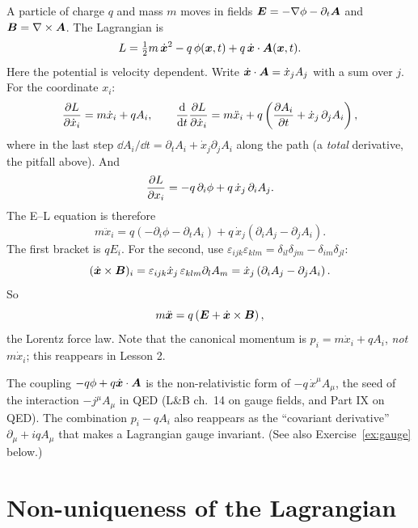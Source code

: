 \documentclass[11pt]{article}
\begin{document}
\begin{example}
A particle of charge $q$ and mass $m$ moves in fields $\bm{E}=-\nabla\phi-\partial_t\bm{A}$ and $\bm{B}=\nabla\times\bm{A}$. The Lagrangian is
\begin{equation}
  L=\tfrac12m\,\dot{\bm{x}}^2-q\,\phi(\bm{x},t)+q\,\dot{\bm{x}}\cdot\bm{A}(\bm{x},t).
\end{equation}
Here the potential is velocity dependent. Write $\dot{\bm{x}}\cdot\bm{A}=\dot x_jA_j$ with a sum over $j$. For the coordinate $x_i$:
\[
 \frac{\partial L}{\partial \dot x_i}=m\dot x_i+qA_i,\qquad
 \frac{\mathrm{d} }{\mathrm{d} t}\frac{\partial L}{\partial \dot x_i}=m\ddot x_i+q\left(\frac{\partial A_i}{\partial t}+\dot x_j\,\partial_jA_i\right),
\]
where in the last step $\dd A_i/\dd t=\partial_tA_i+\dot x_j\partial_jA_i$ along the path (a \emph{total} derivative, the pitfall above). And
\[
 \frac{\partial L}{\partial x_i}=-q\,\partial_i\phi+q\,\dot x_j\,\partial_iA_j .
\]
The E--L equation is therefore
\begin{equation}
  m\ddot x_i=q\left(-\partial_i\phi-\partial_tA_i\right)+q\,\dot x_j\left(\partial_iA_j-\partial_jA_i\right).
\end{equation}
The first bracket is $qE_i$. For the second, use $\varepsilon_{ijk}\varepsilon_{klm}=\delta_{il}\delta_{jm}-\delta_{im}\delta_{jl}$:
\[
 (\dot{\bm{x}}\times\bm{B})_i=\varepsilon_{ijk}\dot x_j\,\varepsilon_{klm}\partial_lA_m=\dot x_j\left(\partial_iA_j-\partial_jA_i\right).
\]
So
\begin{equation}
  m\ddot{\bm{x}}=q\left(\bm{E}+\dot{\bm{x}}\times\bm{B}\right),
\end{equation}
the Lorentz force law. Note that the canonical momentum is $p_i=m\dot x_i+qA_i$, \emph{not} $m\dot x_i$; this reappears in Lesson 2.
\end{example}

\begin{qftbridge}
The coupling $-q\phi+q\dot{\bm{x}}\cdot\bm{A}$ is the non-relativistic form of $-q\,\dot x^\mu A_\mu$, the seed of the interaction $-j^\mu A_\mu$ in QED (L\&B ch.~14 on gauge fields, and Part IX on QED). The combination $p_i-qA_i$ also reappears as the ``covariant derivative'' $\partial_\mu+iqA_\mu$ that makes a Lagrangian gauge invariant. (See also Exercise~\ref{ex:gauge} below.)
\end{qftbridge}

\section{Non-uniqueness of the Lagrangian}
\end{document}
